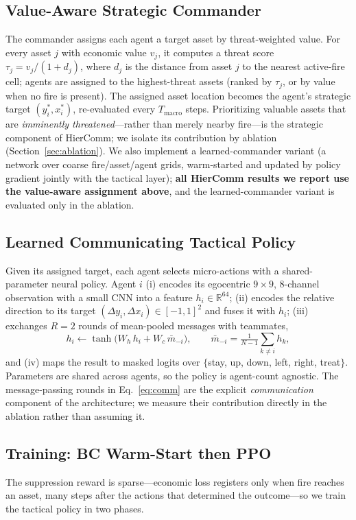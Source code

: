 \documentclass[letterpaper]{article}
\begin{document}
\subsection{Value-Aware Strategic Commander}
\label{sec:commander}
The commander assigns each agent a target asset by threat-weighted value. For every asset $j$ with economic value $v_j$, it computes a threat score $\tau_j = v_j / (1 + d_j)$, where $d_j$ is the distance from asset $j$ to the nearest active-fire cell; agents are assigned to the highest-threat assets (ranked by $\tau_j$, or by value when no fire is present). The assigned asset location becomes the agent's strategic target $(y_i^*, x_i^*)$, re-evaluated every $T_{\text{macro}}$ steps. Prioritizing valuable assets that are \emph{imminently threatened}---rather than merely nearby fire---is the strategic component of HierComm; we isolate its contribution by ablation (Section~\ref{sec:ablation}). We also implement a learned-commander variant (a network over coarse fire/asset/agent grids, warm-started and updated by policy gradient jointly with the tactical layer); \textbf{all HierComm results we report use the value-aware assignment above}, and the learned-commander variant is evaluated only in the ablation.

\subsection{Learned Communicating Tactical Policy}
\label{sec:tactical}
Given its assigned target, each agent selects micro-actions with a shared-parameter neural policy. Agent $i$ (i) encodes its egocentric $9{\times}9$, 8-channel observation with a small CNN into a feature $h_i \in \mathbb{R}^{64}$; (ii) encodes the relative direction to its target $(\Delta y_i, \Delta x_i) \in [-1,1]^2$ and fuses it with $h_i$; (iii) exchanges $R = 2$ rounds of mean-pooled messages with teammates,
\begin{equation}
\label{eq:comm}
h_i \leftarrow \tanh\!\bigl(W_h\, h_i + W_c\, \bar{m}_{-i}\bigr), \qquad \bar{m}_{-i} = \tfrac{1}{N-1}\!\sum_{k \neq i} h_k,
\end{equation}
and (iv) maps the result to masked logits over $\{$stay, up, down, left, right, treat$\}$. Parameters are shared across agents, so the policy is agent-count agnostic. The message-passing rounds in Eq.~\ref{eq:comm} are the explicit \emph{communication} component of the architecture; we measure their contribution directly in the ablation rather than assuming it.

\subsection{Training: BC Warm-Start then PPO}
\label{sec:training}
The suppression reward is sparse---economic loss registers only when fire reaches an asset, many steps after the actions that determined the outcome---so we train the tactical policy in two phases.
\end{document}

